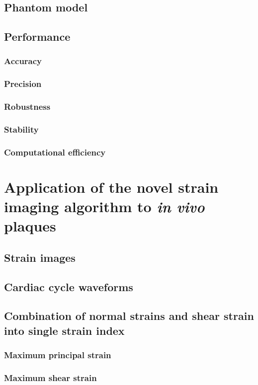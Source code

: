 \documentclass[12pt,twoside]{withesis}
\begin{document}
\section{Phantom model}

\section{Performance}
\subsection{Accuracy}
\subsection{Precision}
\subsection{Robustness}
\subsection{Stability}
\subsection{Computational efficiency}


\chapter{Application of the novel strain imaging algorithm to \textit{in vivo}
plaques}

\section{Strain images}

\section{Cardiac cycle waveforms}

\section{Combination of normal strains and shear strain into single strain index}
\subsection{Maximum principal strain}
\subsection{Maximum shear strain}
\end{document}
